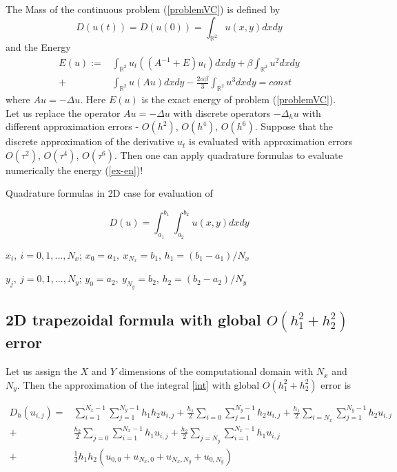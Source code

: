 \documentclass[%
 aip,
cp,  %
 amsmath,amssymb,%
 reprint,%
]{revtex4-2}
\newcommand{\rf}[1]{(\ref{#1})}
\newcommand{\RR}{\mathbb{R}}
\begin{document}
The Mass of the continuous problem \rf{problemVC} is defined by
\begin{equation}\label{int}
D(u(t))=D(u(0))=\int_{\RR^2} u(x,y)dx dy
\end{equation}
and the Energy
\begin{align}\label{ex-en}
E(u):=&\int_{\RR^2} u_t \left((A^{-1}+E)u_t\right) dxdy+
\beta \int_{\RR^2} u^2 dxdy \nonumber\\
+& \int_{\RR^2}u \left(A u\right) dxdy
-\frac{2 \alpha \beta}{3} \int_{\RR^2} u^3 dxdy =const
\end{align}
where $Au=-\Delta u$. Here $E(u)$ is the exact energy of problem \rf{problemVC}. Let us replace the operator $Au=-
\Delta u$ with discrete operators $-\Delta_h u$ with different approximation errors - $O(h^2)$, $O(h^4)$, $O(h^6)$. Suppose that the discrete approximation of the derivative $u_t$ is evaluated with approximation errors $O(\tau^2)$, $O(\tau^4)$, $O(\tau^6)$. Then one can apply quadrature formulas to evaluate numerically the energy \rf{ex-en}!




Quadrature formulas in 2D case for evaluation of 

\begin{equation}\label{int}
D(u)=\int_{a_1}^{b_1} \int_{a_2}^{b_2} u(x,y)dx dy
\end{equation}

$x_i, ~i=0,1,...,N_x$; $x_0=a_1,~x_{N_x}=b_1$, $h_1=(b_1-a_1)/N_x$


$y_j, ~j=0,1,...,N_y$; $y_0=a_2,~y_{N_y}=b_2$,  $h_2=(b_2-a_2)/N_y$

\subsection{ 2D trapezoidal formula with global $O(h_1^2+h_2^2)$ error }

Let us assign the $X$ and $Y$ dimensions of the computational domain with $N_x$ and $N_y$. Then the approximation of the integral \eqref{int} 
with global $O(h_1^2+h_2^2)$ error is

\begin{align}\label{quadr2}
D_h(u_{i,j}) =& \sum_{i=1}^{N_x-1} \sum_{j=1}^{N_y-1} h_1 h_2 u_{i,j}
+\frac{h_1}{2}\sum_{i=0} \sum_{j=1}^{N_y-1} h_2 u_{i,j}
+\frac{h_1}{2}\sum_{i=N_x} \sum_{j=1}^{N_y-1} h_2 u_{i,j} \nonumber\\
+&\frac{h_2}{2}\sum_{j=0} \sum_{i=1}^{N_x-1} h_1 u_{i,j}
+\frac{h_2}{2}\sum_{j=N_y} \sum_{i=1}^{N_x-1} h_1 u_{i,j}
\nonumber\\
+&\frac{1}{4}h_1 h_2 \left(u_{0,0}+u_{N_x,0}+u_{N_x,N_y}+u_{0,N_y}
\right)
\end{align}
\end{document}
